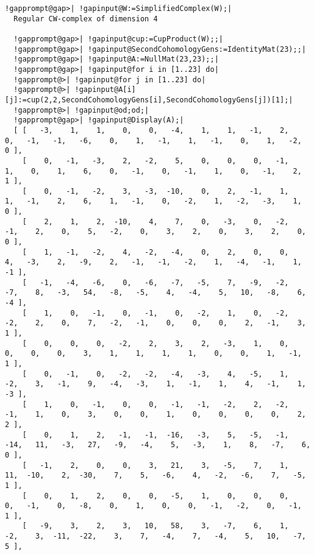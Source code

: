 \documentclass[a4paper,11pt]{report}
\begin{document}
{{\begin{Verbatim}[commandchars=!@|,fontsize=\small,frame=single,label=Example]
  !gapprompt@gap>| !gapinput@W:=SimplifiedComplex(W);|
  Regular CW-complex of dimension 4
  
  !gapprompt@gap>| !gapinput@cup:=CupProduct(W);;|
  !gapprompt@gap>| !gapinput@SecondCohomologyGens:=IdentityMat(23);;|
  !gapprompt@gap>| !gapinput@A:=NullMat(23,23);;|
  !gapprompt@gap>| !gapinput@for i in [1..23] do|
  !gapprompt@>| !gapinput@for j in [1..23] do|
  !gapprompt@>| !gapinput@A[i][j]:=cup(2,2,SecondCohomologyGens[i],SecondCohomologyGens[j])[1];|
  !gapprompt@>| !gapinput@od;od;|
  !gapprompt@gap>| !gapinput@Display(A);|
  [ [   -3,    1,    1,    0,    0,   -4,    1,    1,   -1,    2,    0,   -1,   -1,   -6,    0,    1,   -1,    1,   -1,    0,    1,   -2,    0 ],
    [    0,   -1,   -3,    2,   -2,    5,    0,    0,    0,   -1,    1,    0,    1,    6,    0,   -1,    0,   -1,    1,    0,   -1,    2,    1 ],
    [    0,   -1,   -2,    3,   -3,  -10,    0,    2,   -1,    1,    1,   -1,    2,    6,    1,   -1,    0,   -2,    1,   -2,   -3,    1,    0 ],
    [    2,    1,    2,  -10,    4,    7,    0,   -3,    0,   -2,   -1,    2,    0,    5,   -2,    0,    3,    2,    0,    3,    2,    0,    0 ],
    [    1,   -1,   -2,    4,   -2,   -4,    0,    2,    0,    0,    4,   -3,    2,   -9,    2,   -1,   -1,   -2,    1,   -4,   -1,    1,   -1 ],
    [   -1,   -4,   -6,    0,   -6,   -7,   -5,    7,   -9,   -2,   -7,    8,   -3,   54,   -8,   -5,    4,   -4,    5,   10,   -8,    6,   -4 ],
    [    1,    0,   -1,    0,   -1,    0,   -2,    1,    0,   -2,   -2,    2,    0,    7,   -2,   -1,    0,    0,    0,    2,   -1,    3,    1 ],
    [    0,    0,    0,   -2,    2,    3,    2,   -3,    1,    0,    0,    0,    0,    3,    1,    1,    1,    1,    0,    0,    1,   -1,    1 ],
    [    0,   -1,    0,   -2,   -2,   -4,   -3,    4,   -5,    1,   -2,    3,   -1,    9,   -4,   -3,    1,   -1,    1,    4,   -1,    1,   -3 ],
    [    1,    0,   -1,    0,    0,   -1,   -1,   -2,    2,   -2,   -1,    1,    0,    3,    0,    0,    1,    0,    0,    0,    0,    2,    2 ],
    [    0,    1,    2,   -1,   -1,  -16,   -3,    5,   -5,   -1,  -14,   11,   -3,   27,   -9,   -4,    5,   -3,    1,    8,   -7,    6,    0 ],
    [   -1,    2,    0,    0,    3,   21,    3,   -5,    7,    1,   11,  -10,    2,  -30,    7,    5,   -6,    4,   -2,   -6,    7,   -5,    1 ],
    [    0,    1,    2,    0,    0,   -5,    1,    0,    0,    0,    0,   -1,    0,   -8,    0,    1,    0,    0,   -1,   -2,    0,   -1,    1 ],
    [   -9,    3,    2,    3,   10,   58,    3,   -7,    6,    1,   -2,    3,  -11,  -22,    3,    7,   -4,    7,   -4,    5,   10,   -7,    5 ],

\end{Verbatim}}}
\end{document}
